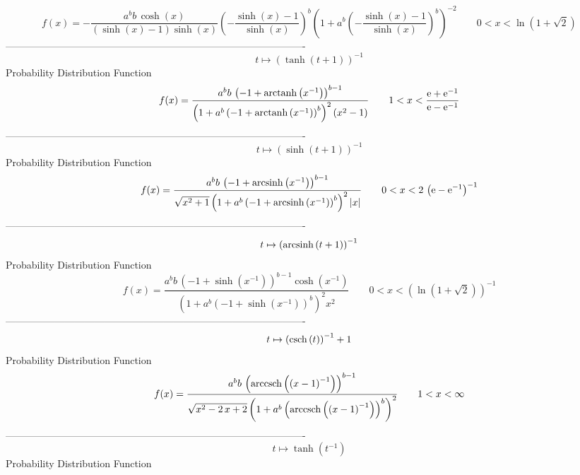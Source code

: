 \documentclass[12pt]{article}
\begin{document}
$$  f(x)=-{\frac {{a}^{b}b\,\cosh \left( x \right) }{ \left( \sinh \left( x
 \right) -1 \right) \sinh \left( x \right) } \left( -{\frac {\sinh
 \left( x \right) -1}{\sinh \left( x \right) }} \right) ^{b} \left( 1+
{a}^{b} \left( -{\frac {\sinh \left( x \right) -1}{\sinh \left( x
 \right) }} \right) ^{b} \right) ^{-2}}
 \qquad0
 < x < \ln  \left( 1+\sqrt {2} \right) 
$$-------------------------------------------------------------------------------------------  \\$$t\mapsto  \left( \tanh \left( t+1 \right)  \right) ^{-1}
$$Probability Distribution Function 
$$  f(x)={\frac {{a}^{b}b\, \left( -1+{\rm arctanh} \left({x}^{-1}\right)
 \right) ^{b-1}}{ \left( 1+{a}^{b} \left( -1+{\rm arctanh} \left({x}^{
-1}\right) \right) ^{b} \right) ^{2} \left( {x}^{2}-1 \right) }}
 \qquad1
 < x < {\frac {{\rm e}+{{\rm e}^{-1}}}{{\rm e}-{{\rm e}^{-1}}}}
$$-------------------------------------------------------------------------------------------  \\$$t\mapsto  \left( \sinh \left( t+1 \right)  \right) ^{-1}
$$Probability Distribution Function 
$$  f(x)={\frac {{a}^{b}b\, \left( -1+{\rm arcsinh} \left({x}^{-1}\right)
 \right) ^{b-1}}{\sqrt {{x}^{2}+1} \left( 1+{a}^{b} \left( -1+
{\rm arcsinh} \left({x}^{-1}\right) \right) ^{b} \right) ^{2} \left| x
 \right| }}
 \qquad0
 < x < 2\, \left( {\rm e}-{{\rm e}^{-1}} \right) ^{-1}
$$-------------------------------------------------------------------------------------------  \\$$t\mapsto  \left( {\rm arcsinh} \left(t+1\right) \right) ^{-1}
$$Probability Distribution Function 
$$  f(x)={\frac {{a}^{b}b\, \left( -1+\sinh \left( {x}^{-1} \right)  \right) ^{
b-1}\cosh \left( {x}^{-1} \right) }{ \left( 1+{a}^{b} \left( -1+\sinh
 \left( {x}^{-1} \right)  \right) ^{b} \right) ^{2}{x}^{2}}}
 \qquad0
 < x <  \left( \ln  \left( 1+\sqrt {2} \right)  \right) ^{-1}
$$-------------------------------------------------------------------------------------------  \\$$t\mapsto  \left( {\rm csch} \left(t\right) \right) ^{-1}+1
$$Probability Distribution Function 
$$  f(x)={\frac {{a}^{b}b\, \left( {\rm arccsch} \left( \left( x-1 \right) ^{-1
}\right) \right) ^{b-1}}{\sqrt {{x}^{2}-2\,x+2} \left( 1+{a}^{b}
 \left( {\rm arccsch} \left( \left( x-1 \right) ^{-1}\right) \right) ^
{b} \right) ^{2}}}
 \qquad1
 < x < \infty 
$$-------------------------------------------------------------------------------------------  \\$$t\mapsto \tanh \left( {t}^{-1} \right) 
$$Probability Distribution Function 
\end{document}
